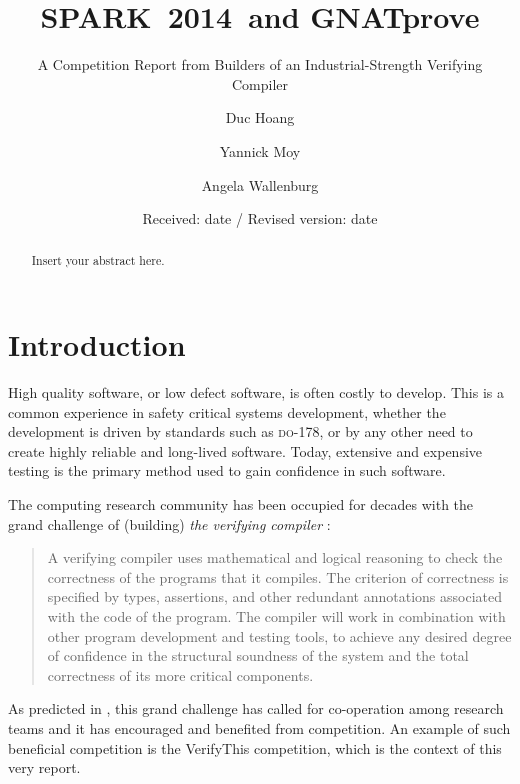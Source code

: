 \documentclass[sttt,draft]{svjour}
\newcommand{\DO}{\textsc{do-178}}
\newcommand{\gnatprove}{GNATprove\xspace}
\newcommand{\newspark}{SPARK~2014\xspace}
\begin{document}
%
\title{\newspark\ and \gnatprove}
\subtitle{A Competition Report from Builders of an Industrial-Strength Verifying Compiler}
\author{Duc Hoang \and Yannick Moy \and Angela Wallenburg
}                     %

\date{Received: date / Revised version: date}
%
\maketitle
%
\begin{abstract}
Insert your abstract here.
\end{abstract}
%
\section{Introduction}
\label{intro}
High quality software, or low defect software, is often costly to
develop. This is a common experience in safety critical systems
development, whether the development is driven by standards such as
\DO, or by any other need to create highly reliable and long-lived
software. Today, extensive and expensive testing is the primary method
used to gain confidence in such software.

The computing research community has been occupied for decades with
the grand challenge of (building) \emph{the verifying compiler}
\cite{Hoare03theverifying}:
%
\begin{quote} A verifying compiler uses mathematical and logical reasoning
  to check the correctness of the programs that it compiles. The
  criterion of correctness is specified by types, assertions, and
  other redundant annotations associated with the code of the
  program. The compiler will work in combination with other program
  development and testing tools, to achieve any desired degree of
  confidence in the structural soundness of the system and the total
  correctness of its more critical components.
\end{quote}

As predicted in \cite{Hoare03theverifying}, this grand challenge has
called for co-operation among research teams and it has encouraged
and benefited from competition. An example of such beneficial
competition is the VerifyThis competition, which is the context of
this very report.
\end{document}
